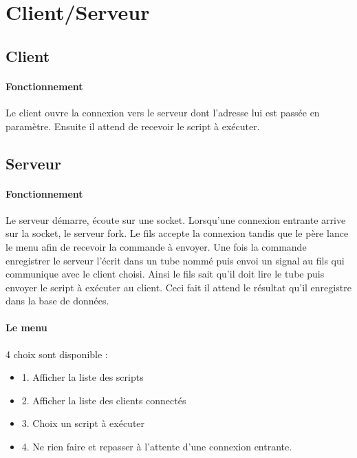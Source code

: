 \documentclass[11pt,a4paper,titlepage, oneside]{article}
\begin{document}
		
\newpage
\section{{\color{red} Client/Serveur}}
	\subsection{\color{blue}Client}
		\paragraph{Fonctionnement}
			Le client ouvre la connexion vers le serveur dont l'adresse lui est passée en paramètre. Ensuite il attend de recevoir le script à exécuter. 
	\subsection{\color{blue}Serveur}
		\paragraph{Fonctionnement}
			Le serveur démarre, écoute sur une socket. Lorsqu'une connexion entrante arrive sur la socket, le serveur fork. Le fils accepte la connexion tandis que le père lance le menu afin de recevoir la commande à envoyer. Une fois la commande enregistrer le serveur l'écrit dans un tube nommé puis envoi un signal au fils qui communique avec le client choisi. Ainsi le fils sait qu'il doit lire le tube puis envoyer le script à exécuter au client. Ceci fait il attend le résultat qu'il enregistre dans la base de données.
		\paragraph{Le menu}
			4 choix sont disponible : 
			\begin{itemize}
				\item 1. Afficher la liste des scripts
				\item 2. Afficher la liste des clients connectés
				\item 3. Choix un script à exécuter
				\item 4. Ne rien faire et repasser à l'attente d'une connexion entrante.
			\end{itemize}

\newpage
\end{document}
